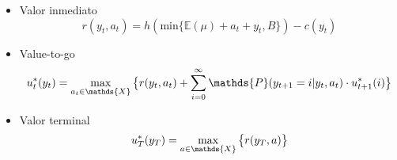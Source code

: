 \documentclass[letterpaper,10pt]{article}
\begin{document}
\begin{itemize}
    \item Valor inmediato
    $$ r(y_t, a_t) = h(\text{min}\{\mathds{E}(\mu) + a_t + y_t, B\}) - c(y_t) $$
    
    \item Value-to-go
    $$ u^*_t(y_t) = \max_{a_t \in \mathds{X}} \big{\{}r(y_t, a_t) + \sum\limits_{i=0}^{\infty}\mathds{P}(y_{t+1}=i | y_t, a_t) \cdot u^*_{t+1}(i)\big{\}} $$
    
    \item Valor terminal
    $$ u^*_T(y_T) = \max_{a \in \mathds{X}} \big{\{} r(y_T, a) \big{\}}$$
    

\end{itemize}


\small{
	
	
}
\end{document}
